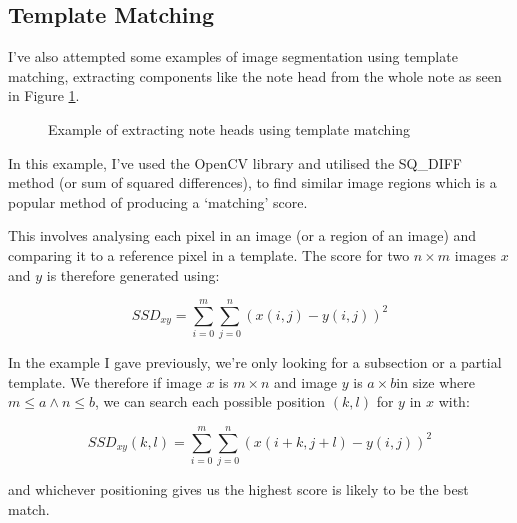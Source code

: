 \subsection{Template Matching}

I've also attempted some examples of image segmentation using template matching, extracting components like the note head from the whole note as seen in Figure \ref{fig:templatematch}.

\begin{figure}[h!]
  \centering
  \caption{Example of extracting note heads using template matching}
  \label{fig:templatematch}
\end{figure}

In this example, I've used the OpenCV library and utilised the SQ\_DIFF method (or sum of squared differences), to find similar image regions which is a popular method of producing a `matching' score.

This involves analysing each pixel in an image (or a region of an image) and comparing it to a reference pixel in a template. The score for two $n \times m$ images $x$ and $y$ is therefore generated using:

$$SSD_{xy} = \sum_{i = 0}^m \sum_{j = 0}^n (x(i, j) - y(i, j))^2$$

In the example I gave previously, we're only looking for a subsection or a partial template. We therefore if image $x$ is $m \times n$ and image $y$ is $a \times b$in size where $m \le a \land n \le b$, we can search each possible position $(k, l)$ for $y$ in $x$ with:

$$SSD_{xy}(k, l) = \sum_{i = 0}^m \sum_{j = 0}^n (x(i + k, j + l) - y(i, j))^2$$

and whichever positioning gives us the highest score is likely to be the best match.
